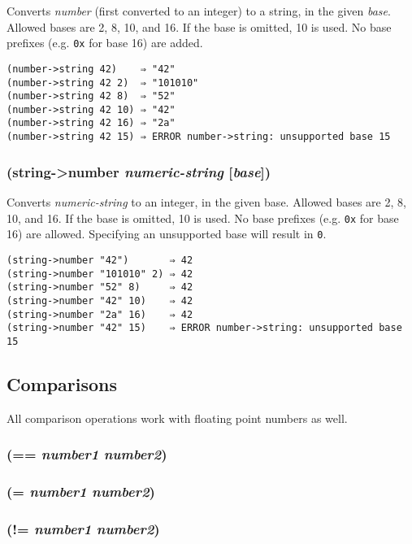 \documentclass{article}
\begin{document}
Converts \emph{number} (first converted to an integer) to a string, in the given \emph{base}.
Allowed bases are 2, 8, 10, and 16. If the base is omitted, 10 is used. No base prefixes (e.g.
\texttt{0x} for base 16) are added.

\begin{verbatim}
(number->string 42)    ⇒ "42"
(number->string 42 2)  ⇒ "101010"
(number->string 42 8)  ⇒ "52"
(number->string 42 10) ⇒ "42"
(number->string 42 16) ⇒ "2a"
(number->string 42 15) ⇒ ERROR number->string: unsupported base 15
\end{verbatim}

\subsubsection{(string-\textgreater{}number \emph{numeric-string} [\emph{base}])}

Converts \emph{numeric-string} to an integer, in the given base. Allowed bases are 2,
8, 10, and 16. If the base is omitted, 10 is used. No base prefixes (e.g. \verb|0x|
for base 16) are allowed. Specifying an unsupported base will result in \verb|0|.

\begin{verbatim}
(string->number "42")       ⇒ 42
(string->number "101010" 2) ⇒ 42
(string->number "52" 8)     ⇒ 42
(string->number "42" 10)    ⇒ 42
(string->number "2a" 16)    ⇒ 42
(string->number "42" 15)    ⇒ ERROR number->string: unsupported base 15
\end{verbatim}

\subsection{Comparisons}\label{sec:comparisons}

All comparison operations work with floating point numbers as well.

\subsubsection{(== \emph{number1} \emph{number2})}

\subsubsection{(= \emph{number1} \emph{number2})}

\subsubsection{(!= \emph{number1} \emph{number2})}
\end{document}
